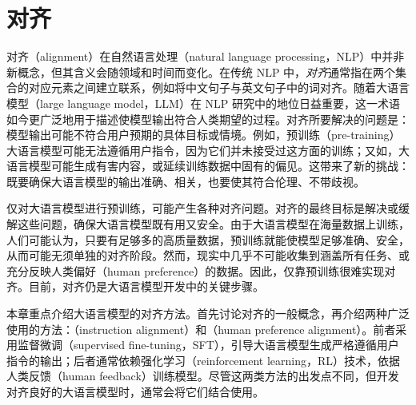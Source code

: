 
%




\chapter{对齐}

\thispagestyle{chapterurl} %

\noindent 对齐（alignment）在自然语言处理（natural language processing，NLP）中并非新概念，但其含义会随领域和时间而变化。在传统 NLP 中，\textit{对齐}通常指在两个集合的对应元素之间建立联系，例如将中文句子与英文句子中的词对齐。随着大语言模型（large language model，LLM）在 NLP 研究中的地位日益重要，这一术语如今更广泛地用于描述使模型输出符合人类期望的过程。对齐所要解决的问题是：模型输出可能不符合用户预期的具体目标或情境。例如，预训练（pre-training）大语言模型可能无法遵循用户指令，因为它们并未接受过这方面的训练；又如，大语言模型可能生成有害内容，或延续训练数据中固有的偏见。这带来了新的挑战：既要确保大语言模型的输出准确、相关，也要使其符合伦理、不带歧视。

仅对大语言模型进行预训练，可能产生各种对齐问题。对齐的最终目标是解决或缓解这些问题，确保大语言模型既有用又安全。由于大语言模型在海量数据上训练，人们可能认为，只要有足够多的高质量数据，预训练就能使模型足够准确、安全，从而可能无须单独的对齐阶段。然而，现实中几乎不可能收集到涵盖所有任务、或充分反映人类偏好（human preference）的数据。因此，仅靠预训练很难实现对齐。目前，对齐仍是大语言模型开发中的关键步骤。

本章重点介绍大语言模型的对齐方法。首先讨论对齐的一般概念，再介绍两种广泛使用的方法：（instruction alignment）和（human preference alignment）。前者采用监督微调（supervised fine-tuning，SFT），引导大语言模型生成严格遵循用户指令的输出；后者通常依赖强化学习（reinforcement learning，RL）技术，依据人类反馈（human feedback）训练模型。尽管这两类方法的出发点不同，但开发对齐良好的大语言模型时，通常会将它们结合使用。

